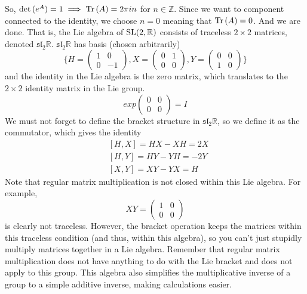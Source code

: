     So, $\det{(e^A)} = 1 \implies \Tr{(A)} = 2 \pi i n$ for $n \in \mathbb{Z}$. Since we want to component connected to the identity, we choose $n=0$ meaning that $\Tr{(A)} = 0$. And we are done. That is, the Lie algebra of $\SL(2, \mathbb{R})$ consists of traceless $2 \times 2$ matrices, denoted $\mathfrak{sl}_2 \mathbb{R}$. $\mathfrak{sl}_2 \mathbb{R}$ has basis (chosen arbitrarily) 
    \begin{equation}
      \bigg\{ H = \begin{pmatrix}
      1&0\\0&-1
      \end{pmatrix}, X = \begin{pmatrix}
      0&1\\0&0
      \end{pmatrix}, Y = \begin{pmatrix}
      0&0\\1&0
      \end{pmatrix}\bigg\}
    \end{equation}
    and the identity in the Lie algebra is the zero matrix, which translates to the $2 \times 2$ identity matrix in the Lie group. 
    \begin{equation}
      exp \begin{pmatrix}
      0&0\\0&0
      \end{pmatrix} = I
    \end{equation}
    We must not forget to define the bracket structure in $\mathfrak{sl}_2 \mathbb{R}$, so we define it as the commutator, which gives the identity
    \begin{align*}
      & [H,X] = HX - XH = 2X \\
      & [H,Y] = HY - YH = -2Y \\
      & [X,Y] = XY - YX = H
    \end{align*}
    Note that regular matrix multiplication is not closed within this Lie algebra. For example, 
    \begin{equation}
      X Y = \begin{pmatrix}
      1&0\\0&0
      \end{pmatrix}
    \end{equation}
    is clearly not traceless. However, the bracket operation keeps the matrices within this traceless condition (and thus, within this algebra), so you can't just stupidly multiply matrices together in a Lie algebra. Remember that regular matrix multiplication does not have anything to do with the Lie bracket and does not apply to this group. This algebra also simplifies the multiplicative inverse of a group to a simple additive inverse, making calculations easier. 

